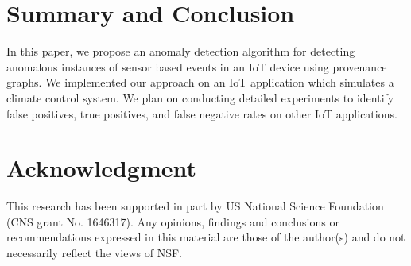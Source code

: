


\section{Summary and Conclusion}

In this paper, we propose an anomaly detection algorithm for detecting anomalous instances of sensor based events in an IoT device using provenance graphs. We implemented our approach on an IoT application which simulates a climate control system. We plan on conducting detailed experiments to identify false positives, true positives, and false negative rates on other IoT applications. 




\section{Acknowledgment}
This research has been supported in part by US National Science Foundation (CNS grant No. 1646317). Any opinions, findings and conclusions or recommendations expressed in this material are those of the author(s) and do not necessarily reflect the views of NSF.



